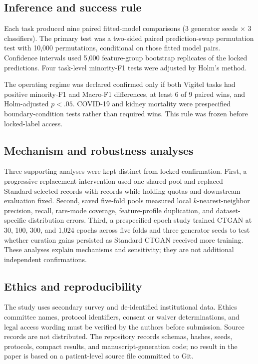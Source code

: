 \subsection{Inference and success rule}

Each task produced nine paired fitted-model comparisons (3 generator seeds $\times$ 3 classifiers). The primary test was a two-sided paired prediction-swap permutation test with 10,000 permutations, conditional on those fitted model pairs. Confidence intervals used 5,000 feature-group bootstrap replicates of the locked predictions. Four task-level minority-F1 tests were adjusted by Holm's method.

The operating regime was declared confirmed only if both Vigitel tasks had positive minority-F1 and Macro-F1 differences, at least 6 of 9 paired wins, and Holm-adjusted $p<.05$. COVID-19 and kidney mortality were prespecified boundary-condition tests rather than required wins. This rule was frozen before locked-label access.

\subsection{Mechanism and robustness analyses}

Three supporting analyses were kept distinct from locked confirmation. First, a progressive replacement intervention used one shared pool and replaced Standard-selected records with \sepa{} records while holding quotas and downstream evaluation fixed. Second, saved five-fold pools measured local $k$-nearest-neighbor precision, recall, rare-mode coverage, feature-profile duplication, and dataset-specific distribution errors. Third, a prespecified epoch study trained CTGAN at 30, 100, 300, and 1,024 epochs across five folds and three generator seeds to test whether curation gains persisted as Standard CTGAN received more training. These analyses explain mechanisms and sensitivity; they are not additional independent confirmations.

\subsection{Ethics and reproducibility}

The study uses secondary survey and de-identified institutional data. Ethics committee names, protocol identifiers, consent or waiver determinations, and legal access wording must be verified by the authors before submission. Source records are not distributed. The repository records schemas, hashes, seeds, protocols, compact results, and manuscript-generation code; no result in the paper is based on a patient-level source file committed to Git.
